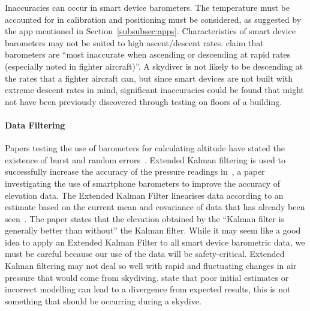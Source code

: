 Inaccuracies can occur in smart device barometers. The temperature must be accounted for in calibration and positioning must be considered, as suggested by the  app mentioned in Section~\ref{subsubsec:apps}. Characteristics of smart device barometers may not be suited to high ascent/descent rates. \textcite{gray_integrated_1995} claim that barometers are ``most inaccurate when ascending or descending at rapid rates (especially noted in fighter aircraft)''. A skydiver is not likely to be descending at the rates that a fighter aircraft can, but since smart devices are not built with extreme descent rates in mind, significant inaccuracies could be found that might not have been previously discovered through testing on floors of a building.

\paragraph{Data Filtering}\label{data-filtering}
Papers testing the use of barometers for calculating altitude have stated the existence of burst and random errors~\cite{gray_integrated_1995, liu_beyond_2014}. Extended Kalman filtering is used to successfully increase the accuracy of the pressure readings in~\textcite{liu_beyond_2014}, a paper investigating the use of smartphone barometers to improve the accuracy of elevation data. The Extended Kalman Filter linearises data according to an estimate based on the current mean and covariance of data that has already been seen~\cite{julier_unscented_2004}. The paper states that the elevation obtained by the ``Kalman filter is generally better than without'' the Kalman filter. While it may seem like a good idea to apply an Extended Kalman Filter to all smart device barometric data, we must be careful because our use of the data will be safety-critical. Extended Kalman filtering may not deal so well with rapid and fluctuating changes in air pressure that would come from skydiving. \textcite{huang_analysis_2008} state that poor initial estimates or incorrect modelling can lead to a divergence from expected results, this is not something that should be occurring during a skydive.

